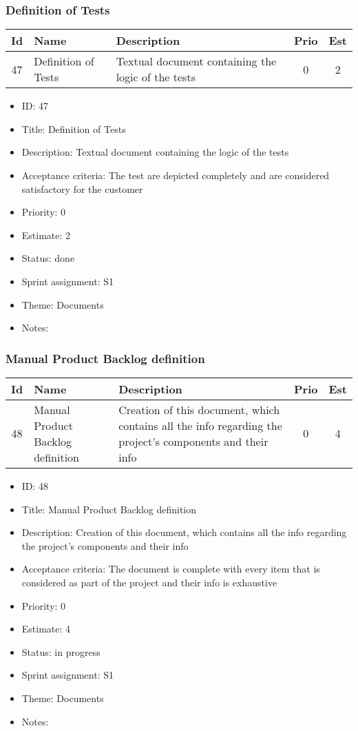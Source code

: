 \newpage
\subsubsection{Definition of Tests}
\begin{tabular}{|c|m{1.5cm}|m{4cm}|c|c|}
	\hline
	\textbf{Id}&\textbf{Name}&\textbf{Description}&\textbf{Prio}&\textbf{Est}\\
	\hline
	47 & Definition of Tests & 
	Textual document containing the logic of the tests &
	0 & 2 \\
	\hline
\end{tabular}
\begin{itemize}
	\item ID: 47
	\item Title: Definition of Tests
	\item Description: Textual document containing the logic of the tests
	\item Acceptance criteria: The test are depicted completely and are considered satisfactory for the customer
	\item Priority: 0
	\item Estimate: 2
	\item Status: done
	\item Sprint assignment: S1
	\item Theme: Documents
	\item Notes:
\end{itemize}

\newpage
\subsubsection{Manual Product Backlog definition}
\begin{tabular}{|c|m{1.5cm}|m{4cm}|c|c|}
	\hline
	\textbf{Id}&\textbf{Name}&\textbf{Description}&\textbf{Prio}&\textbf{Est}\\
	\hline
	48 & Manual Product Backlog definition & 
	Creation of this document, which contains all the info regarding the project's components and their info &
	0 & 4 \\
	\hline
\end{tabular}
\begin{itemize}
	\item ID: 48
	\item Title: Manual Product Backlog definition
	\item Description: Creation of this document, which contains all the info regarding the project's components and their info
	\item Acceptance criteria: The document is complete with every item that is considered as part of the project and their info is exhaustive
	\item Priority: 0
	\item Estimate: 4
	\item Status: in progress
	\item Sprint assignment: S1
	\item Theme: Documents
	\item Notes:
\end{itemize}

